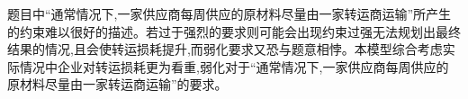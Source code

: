题目中“通常情况下,一家供应商每周供应的原材料尽量由一家转运商运输”所产生的约束难以很好的描述。若过于强烈的要求则可能会出现约束过强无法规划出最终结果的情况,且会使转运损耗提升,而弱化要求又恐与题意相悖。本模型综合考虑实际情况中企业对转运损耗更为看重,弱化对于“通常情况下,一家供应商每周供应的原材料尽量由一家转运商运输”的要求。

